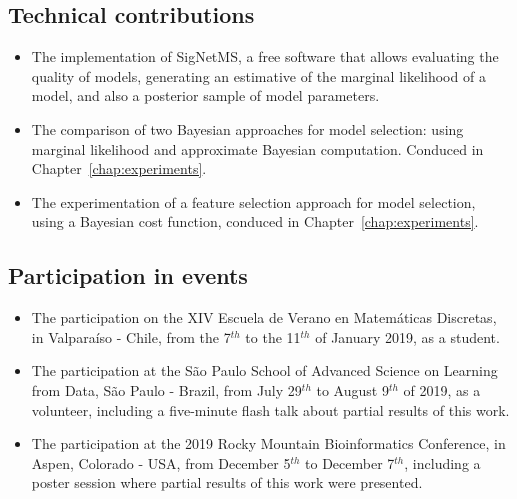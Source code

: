 \subsection{Technical contributions}
\begin{itemize}
\item{The implementation of SigNetMS, a free software that allows
    evaluating the quality of models, generating an estimative of the
    marginal likelihood of a model, and also a posterior sample of model
    parameters.}
\item{The comparison of two Bayesian approaches for model selection:
    using marginal likelihood and approximate Bayesian computation.
    Conduced in Chapter~\ref{chap:experiments}.}
\item{The experimentation of a feature selection approach for model
    selection, using a Bayesian cost function, conduced in
    Chapter~\ref{chap:experiments}.}
\end{itemize}

\subsection{Participation in events}
\begin{itemize}
\item{The participation on the XIV Escuela de Verano en Matemáticas
    Discretas, in Valparaíso - Chile, from the 7$^{th}$ to the
    11$^{th}$ of January 2019, as a student.}
\item{The participation at the São Paulo School of Advanced Science on 
    Learning from Data, São Paulo - Brazil, from July 29$^{th}$ to
    August 9$^{th}$ of 2019, as a volunteer, including a 
    five-minute flash talk about partial results of this work.}
\item{The participation at the 2019 Rocky Mountain Bioinformatics 
    Conference, in Aspen, Colorado - USA, from December 5$^{th}$ to
    December 7$^{th}$, including a poster session where partial results 
    of this work were presented.}
\end{itemize}

